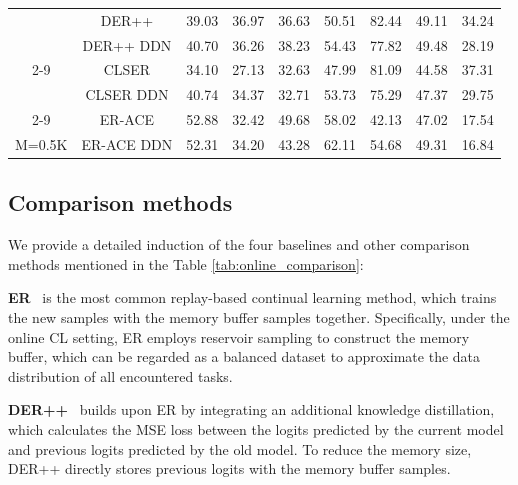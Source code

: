 \documentclass[table, xcdraw]{article}
\theoremstyle{plain}
\theoremstyle{definition}
\theoremstyle{remark}
\begin{document}
\begin{table}[!htp]
\begin{center}
\begin{tabular}{ccccccccc}
 & DER++ & 39.03 & 36.97 & 36.63 & 50.51 & 82.44 & 49.11 & 34.24 \\
 & \cellcolor[HTML]{D8D8D8}DER++ DDN & \cellcolor[HTML]{D8D8D8}40.70 & \cellcolor[HTML]{D8D8D8}36.26 & \cellcolor[HTML]{D8D8D8}38.23 & \cellcolor[HTML]{D8D8D8}54.43 & \cellcolor[HTML]{D8D8D8}77.82 & \cellcolor[HTML]{D8D8D8}49.48 & \cellcolor[HTML]{D8D8D8}28.19 \\ \cline{2-9}
 & CLSER & 34.10 & 27.13 & 32.63 & 47.99 & 81.09 & 44.58 & 37.31 \\
 & \cellcolor[HTML]{D8D8D8}CLSER DDN & \cellcolor[HTML]{D8D8D8}40.74 & \cellcolor[HTML]{D8D8D8}34.37 & \cellcolor[HTML]{D8D8D8}32.71 & \cellcolor[HTML]{D8D8D8}53.73 & \cellcolor[HTML]{D8D8D8}75.29 & \cellcolor[HTML]{D8D8D8}47.37 & \cellcolor[HTML]{D8D8D8}29.75 \\ \cline{2-9}
 & ER-ACE & 52.88 & 32.42 & 49.68 & 58.02 & 42.13 & 47.02 & 17.54 \\
\multirow{-8}{*}{M=0.5K} & \cellcolor[HTML]{D8D8D8}ER-ACE DDN & \cellcolor[HTML]{D8D8D8}52.31 & \cellcolor[HTML]{D8D8D8}34.20 & \cellcolor[HTML]{D8D8D8}43.28 & \cellcolor[HTML]{D8D8D8}62.11 & \cellcolor[HTML]{D8D8D8}54.68 & \cellcolor[HTML]{D8D8D8}49.31 & \cellcolor[HTML]{D8D8D8}16.84 \\ \hline
\end{tabular}
\end{center}

\end{table}


\subsection{Comparison methods}
We provide a detailed induction of the four baselines and other comparison methods mentioned in the Table \ref{tab:online_comparison}:

\textbf{ER}~\cite{ERratcliff1990connectionist} is the most common replay-based continual learning method, 
which trains the new samples with the memory buffer samples together. Specifically, under the online CL setting, ER employs reservoir sampling to construct the memory buffer, which can be regarded as a balanced dataset to approximate the data distribution of all encountered tasks.

\textbf{DER++}~\cite{derpp}
builds upon ER by integrating an additional knowledge distillation, which calculates the MSE loss between the logits predicted by the current model and previous logits predicted by the old model. To reduce the memory size, DER++ directly stores previous logits with the memory buffer samples.
\end{document}
